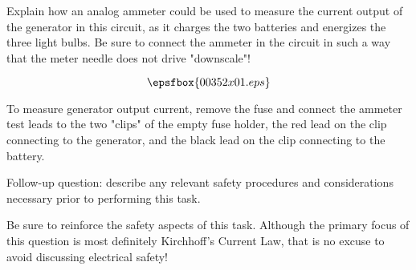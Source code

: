 

Explain how an analog ammeter could be used to measure the current output of the generator in this circuit, as it charges the two batteries and energizes the three light bulbs.  Be sure to connect the ammeter in the circuit in such a way that the meter needle does not drive "downscale"!

$$\epsfbox{00352x01.eps}$$







To measure generator output current, remove the fuse and connect the ammeter test leads to the two "clips" of the empty fuse holder, the red lead on the clip connecting to the generator, and the black lead on the clip connecting to the battery.

\vskip 10pt

Follow-up question: describe any relevant safety procedures and considerations necessary prior to performing this task.







Be sure to reinforce the safety aspects of this task.  Although the primary focus of this question is most definitely Kirchhoff's Current Law, that is no excuse to avoid discussing electrical safety!




